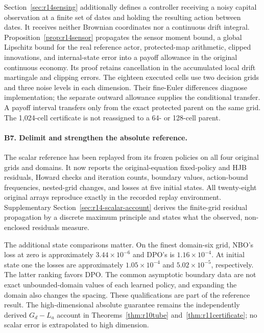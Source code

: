 Section~\ref{sec:r14sensing} additionally defines a controller receiving a noisy capital observation at a finite set of dates and holding the resulting action between dates. It receives neither Brownian coordinates nor a continuous drift integral. Proposition~\ref{prop:r14sensor} propagates the sensor moment bound, a global Lipschitz bound for the real reference actor, protected-map arithmetic, clipped innovations, and internal-state error into a payoff allowance in the original continuous economy. Its proof retains cancellation in the accumulated local drift martingale and clipping errors. The eighteen executed cells use two decision grids and three noise levels in each dimension. Their fine-Euler differences diagnose implementation; the separate outward allowance supplies the conditional transfer. A payoff interval transfers only from the exact protected parent on the same grid. The 1,024-cell certificate is not reassigned to a 64- or 128-cell parent.

\paragraph*{B7. Delimit and strengthen the absolute reference.}
The scalar reference has been replayed from its frozen policies on all four original grids and domains. It now reports the original-equation fixed-policy and HJB residuals, Howard checks and iteration counts, boundary values, action-bound frequencies, nested-grid changes, and losses at five initial states. All twenty-eight original arrays reproduce exactly in the recorded replay environment. Supplementary Section~\ref{sec:r14-scalar-account} derives the finite-grid residual propagation by a discrete maximum principle and states what the observed, non-enclosed residuals measure.

The additional state comparisons matter. On the finest domain-six grid, NBO's loss at zero is approximately $3.44\times10^{-6}$ and DPO's is $1.16\times10^{-4}$. At initial state one the losses are approximately $1.05\times10^{-4}$ and $5.02\times10^{-5}$, respectively. The latter ranking favors DPO. The common asymptotic boundary data are not exact unbounded-domain values of each learned policy, and expanding the domain also changes the spacing. These qualifications are part of the reference result. The high-dimensional absolute guarantee remains the independently derived $G_d-L_a$ account in Theorems~\ref{thm:r10tube} and~\ref{thm:r11certificate}; no scalar error is extrapolated to high dimension.


